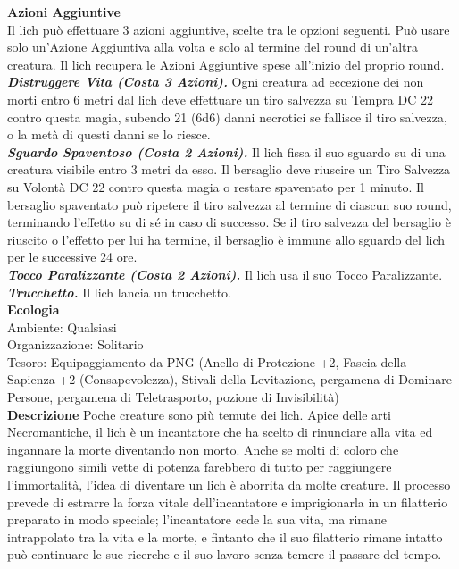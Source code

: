 \begin{multicols}{2}
\textbf{Azioni Aggiuntive}\\

Il lich può effettuare 3 azioni aggiuntive, scelte tra le opzioni seguenti. Può usare solo un'Azione Aggiuntiva alla volta e solo al termine del round di un'altra creatura. Il lich recupera le Azioni Aggiuntive spese all'inizio del proprio round.\\

\emph{\textbf{Distruggere Vita (Costa 3 Azioni).}} Ogni creatura ad eccezione dei non morti entro 6 metri dal lich deve effettuare un tiro salvezza su Tempra DC  22 contro questa magia, subendo 21 (6d6) danni necrotici se fallisce il tiro salvezza, o la metà di questi danni se lo riesce.\\

\emph{\textbf{Sguardo Spaventoso (Costa 2 Azioni).}} Il lich fissa il suo sguardo su di una creatura visibile entro 3 metri da esso. Il bersaglio deve riuscire un Tiro Salvezza su Volontà DC  22 contro questa magia o restare spaventato per 1 minuto. Il bersaglio spaventato può ripetere il tiro salvezza al termine di ciascun suo round, terminando l'effetto su di sé in caso di successo. Se il tiro salvezza del bersaglio è riuscito o l'effetto per lui ha termine, il bersaglio è immune allo sguardo del lich per le successive 24 ore.\\

\emph{\textbf{Tocco Paralizzante (Costa 2 Azioni).}} Il lich usa il suo Tocco Paralizzante.\\

\emph{\textbf{Trucchetto.}} Il lich lancia un trucchetto.\\

\textbf{Ecologia}\\
Ambiente: Qualsiasi\\
Organizzazione: Solitario\\
Tesoro: Equipaggiamento da PNG (Anello di Protezione +2, Fascia della Sapienza +2 (Consapevolezza), Stivali della Levitazione, pergamena di Dominare Persone, pergamena di Teletrasporto, pozione di Invisibilità)\\

\textbf{Descrizione}
Poche creature sono più temute dei lich. Apice delle arti Necromantiche, il lich è un incantatore che ha scelto di rinunciare alla vita ed ingannare la morte diventando non morto. Anche se molti di coloro che raggiungono simili vette di potenza farebbero di tutto per raggiungere l'immortalità, l'idea di diventare un lich è aborrita da molte creature. Il processo prevede di estrarre la forza vitale dell'incantatore e imprigionarla in un filatterio preparato in modo speciale; l'incantatore cede la sua vita, ma rimane intrappolato tra la vita e la morte, e fintanto che il suo filatterio rimane intatto può continuare le sue ricerche e il suo lavoro senza temere il passare del tempo.\\



\end{multicols}
